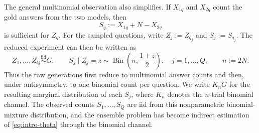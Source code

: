 \documentclass[11pt]{article}
\newcommand{\Bin}{\operatorname{Bin}}
\begin{document}
The general multinomial observation also simplifies.  If $X_{1q}$ and $X_{2q}$ count the gold answers from the two models, then
\[
S_q:=X_{1q}+N-X_{2q}
\]
is sufficient for $Z_q$.  For the sampled questions, write $Z_j:=Z_{q_j}$ and $S_j:=S_{q_j}$.  The reduced experiment can then be written as
\begin{equation}
\label{eq:intro-binomial-channel}
Z_1,\ldots,Z_Q\overset{\mathrm{iid}}{\sim}G,
\qquad
S_j\mid Z_j=z
\sim
\Bin\left(n,\frac{1+z}{2}\right),
\quad j=1,\ldots,Q,
\qquad n:=2N.
\end{equation}
Thus the raw generations first reduce to multinomial answer counts and then, under antisymmetry, to one binomial count per question.  We write $K_nG$ for the resulting marginal distribution of each $S_j$, where $K_n$ denotes the $n$-trial binomial channel.  The observed counts $S_1,\ldots,S_Q$ are iid from this nonparametric binomial-mixture distribution, and the ensemble problem has become indirect estimation of \eqref{eq:intro-theta} through the binomial channel.
\end{document}
